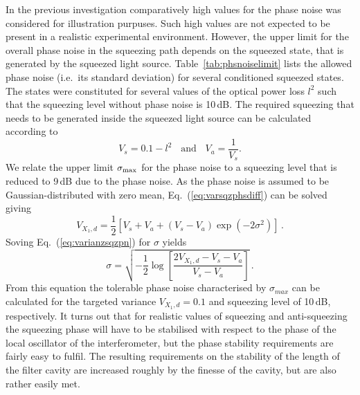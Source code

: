 In the previous investigation comparatively high values for the phase noise was considered for illustration purpuses. Such high values are not expected to be present in a realistic experimental environment. However, the upper limit for the overall phase noise in the squeezing path depends on the squeezed state, that is generated by the squeezed light source. Table~\ref{tab:phsnoiselimit} lists the allowed phase noise (i.e.\ its standard deviation) for several conditioned squeezed states. The states were constituted for several values of the optical power  loss $l^2$ such that the  squeezing level without phase noise is 10\,dB. The required squeezing  that needs to be generated inside the squeezed light source can be calculated according to
\begin{equation}
V_s = 0.1 -l^2\hspace{11pt}\text{and}\hspace{11pt}V_a = \frac{1}{V_s}.
\end{equation}
We relate the upper limit $\sigma_{\rm max}$ for the phase noise to a squeezing level that is reduced to 9\,dB due to the phase noise. As the phase noise is assumed to be Gaussian-distributed with zero mean, Eq.~(\ref{eq:varsqzphsdiff}) can be solved giving
\begin{equation}
V_{X_1,d} = \frac{1}{2}\left[V_s+V_a+(V_s-V_a)\exp\left(-2\sigma^2\right)\right]\,.\label{eq:varianzsqzpn}
\end{equation}
Soving Eq.~(\ref{eq:varianzsqzpn}) for $\sigma$ yields
\begin{equation}
\sigma = \sqrt{-\frac{1}{2}\log\left[\frac{2V_{X_1,d}-V_s-V_a}{V_s-V_a}\right]}\,.
\end{equation}
From this equation the tolerable phase noise characterised  by $\sigma_{max}$ can be calculated for the targeted variance  $V_{X_1,d}=0.1$ and squeezing level of 10\,dB, respectively. It turns out that for realistic values of squeezing and anti-squeezing the squeezing phase will have to be stabilised with respect to the phase of the local oscillator of the interferometer, but the phase stability requirements are fairly easy to fulfil. The resulting requirements on the stability of the length of the filter cavity are increased roughly by the finesse of the cavity, but are also rather easily met.


